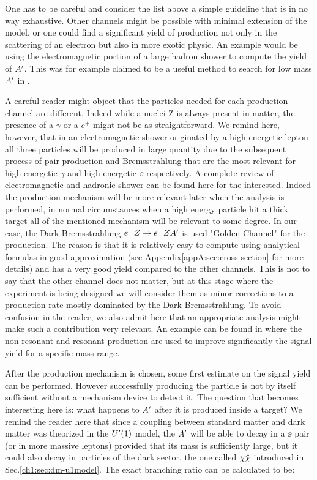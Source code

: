 One has to be careful and consider the list above a simple guideline that is in no way exhaustive. Other channels might be possible with minimal extension of the model, or one could find a significant yield of production not only in the scattering of an electron but also in more exotic physic. An example would be using the electromagnetic portion of a large hadron shower to compute the yield of $A'$. This was for example claimed to be a useful method to search for low mass $A'$ in \cite{Celentano:2020vtu}.

A careful reader might object that the particles needed for each production channel are different. Indeed while a nuclei Z is always present in matter, the presence of a $\gamma$ or a $e^+$ might not be as straightforward. We remind here, however, that in an electromagnetic shower originated by a high energetic lepton all three particles will be produced in large quantity due to the subsequent process of pair-production and Bremsstrahlung that are the most relevant for high energetic $\gamma$ and high energetic $\ee$ respectively. A complete review of electromagnetic and hadronic shower can be found here \cite{Bichsel:2002cf} for the interested. Indeed the production mechanism will be more relevant later when the analysis is performed, in normal circumstances when a high energy particle hit a thick target all of the mentioned mechanism will be relevant to some degree. In our case, the Dark Bremsstrahlung $e^- Z \to e^- Z A'$ is used "Golden Channel" for the production. The reason is that it is relatively easy to compute using analytical formulas in good approximation (see Appendix\ref{appA:sec:cross-section} for more details) and has a very good yield compared to the other channels. This is not to say that the other channel does not matter, but at this stage where the experiment is being designed we will consider them as minor corrections to a production rate mostly dominated by the Dark Bremsstrahlung. To avoid confusion in the reader, we also admit here that an appropriate analysis might make such a contribution very relevant. An example can be found in \cite{Marsicano_2018} where the non-resonant and resonant production are used to improve significantly the signal yield for a specific mass range.

After the production mechanism is chosen, some first estimate on the signal yield can be performed. However successfully producing the particle is not by itself sufficient without a mechanism device to detect it. The question that becomes interesting here is: what happens to $A'$ after it is produced inside a target? We remind the reader here that since a coupling between standard matter and dark matter was theorized in the $U'(1)$ model, the $A'$ will be able to decay in a $\ee$ pair (or in more massive leptons) provided that its mass is sufficiently large, but it could also decay in particles of the dark sector, the one called $\chi \hat{\chi}$ introduced in Sec.\ref{ch1:sec:dm-u1model}. The exact branching ratio can be calculated to be:


